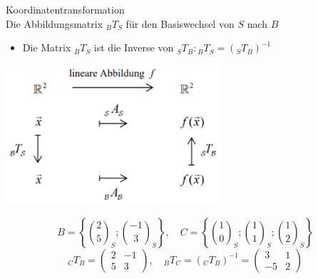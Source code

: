\begin{concept}{Koordinatentransformation}\\
    Die Abbildungsmatrix ${ }_{B} T_{S}$ für den Basiswechsel von $S$ nach $B$
    \begin{itemize}
    \item Die Matrix ${ }_{B} T_{S}$ ist die Inverse von ${ }_{S} T_{B}:{ }_{B} T_{S}=\left({ }_{S} T_{B}\right)^{-1}$
    \end{itemize}
    \begin{center}
    \includegraphics[width=0.6\textwidth]{koordinatentransformation.png}
    \end{center}
\end{concept}

\begin{example}
    $$
    B=\left\{\binom{2}{5}_{S} ;\binom{-1}{3}_{S}\right\}, \quad C=\left\{\binom{1}{0}_{S} ;\binom{1}{1}_{S} ;\binom{1}{2}_{S}\right\}
    $$
    $$
    { }_{C} T_{B}=\left(\begin{array}{cc}
    2 & -1 \\
    5 & 3
    \end{array}\right), \quad { }_{B} T_{C}=\left({ }_{C} T_{B}\right)^{-1}=\left(\begin{array}{cc}
    3 & 1 \\
    -5 & 2
    \end{array}\right)
    $$
\end{example}

